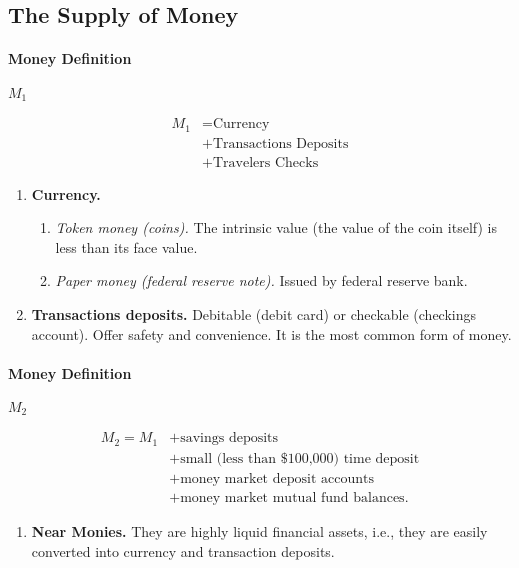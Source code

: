 \subsection{The Supply of Money}

\paragraph{Money Definition} $M_1$

\begin{align*}
	M_1& = \text{Currency}\\& + \text{Transactions Deposits}\\& + \text{Travelers Checks}
\end{align*}

\begin{enumerate}[label = (\arabic*)]
	\item \textbf{Currency.}

		\begin{enumerate}[label = \textbullet]
			\item \textit{Token money (coins).} The intrinsic value (the value of the coin itself) is less than its face value.

			\item \textit{Paper money (federal reserve note).} Issued by federal reserve bank.
		\end{enumerate}
	\item \textbf{Transactions deposits.} Debitable (debit card) or checkable (checkings account). Offer safety and convenience. It is the most common form of money.
\end{enumerate}

\paragraph{Money Definition} $M_2$

\begin{align*}
	M_2 = M_1 &+ \text{savings deposits}\\
	& + \text{small (less than \$100,000) time deposit}\\
	& + \text{money market deposit accounts}\\
	& + \text{money market mutual fund balances}.
\end{align*}

\begin{enumerate}[label = (\arabic*)]
	\item \textbf{Near Monies.}
		They are highly liquid financial assets, i.e., they are easily converted into currency and transaction deposits.
\end{enumerate}

